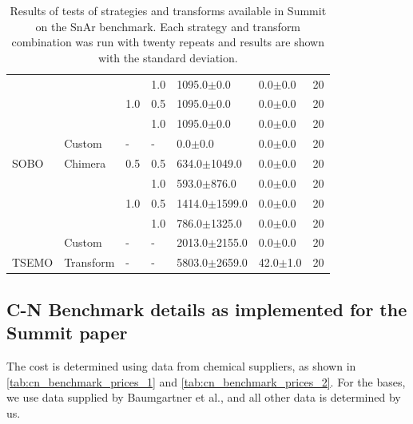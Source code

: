 \begin{table}[]
\begin{tabular}{lllllll}
              &           &     & 1.0 &       1095.0$\pm$0.0 &        0.0$\pm$0.0 &       20 \\
              &           & 1.0 & 0.5 &       1095.0$\pm$0.0 &        0.0$\pm$0.0 &       20 \\
              &           &     & 1.0 &       1095.0$\pm$0.0 &        0.0$\pm$0.0 &       20 \\
              & Custom & - & - &          0.0$\pm$0.0 &        0.0$\pm$0.0 &       20 \\
        SOBO & Chimera & 0.5 & 0.5 &     634.0$\pm$1049.0 &        0.0$\pm$0.0 &       20 \\
              &           &     & 1.0 &      593.0$\pm$876.0 &        0.0$\pm$0.0 &       20 \\
              &           & 1.0 & 0.5 &    1414.0$\pm$1599.0 &        0.0$\pm$0.0 &       20 \\
              &           &     & 1.0 &     786.0$\pm$1325.0 &        0.0$\pm$0.0 &       20 \\
              & Custom & - & - &    2013.0$\pm$2155.0 &        0.0$\pm$0.0 &       20 \\
        TSEMO & Transform & - & - &    5803.0$\pm$2659.0 &       42.0$\pm$1.0 &       20 \\
    \end{tabular}
    \caption{Results of tests of strategies and transforms available in Summit on the SnAr benchmark. Each strategy and transform combination was run with twenty repeats and results are shown with the standard deviation.}
    \label{tab:snar_benchmark_results}
\end{table}


\subsection{C-N Benchmark details as implemented for the Summit paper}


 The cost is determined using data from chemical suppliers, as shown in \ref{tab:cn_benchmark_prices_1} and \ref{tab:cn_benchmark_prices_2}. For the bases, we use data supplied by Baumgartner et al.\cite{Baumgartner2019}, and all other data is determined by us.
 
